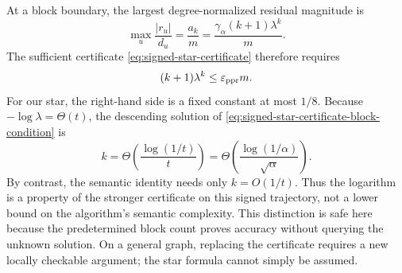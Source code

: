 At a block boundary, the largest degree-normalized residual magnitude is
\begin{equation}
  \max_u\frac{|r_u|}{d_u}
  =\frac{a_k}{m}
  =\frac{\gamma_\alpha(k+1)\lambda^k}{m}.
  \label{eq:signed-star-residual-at-block}
\end{equation}
The sufficient certificate \eqref{eq:signed-star-certificate} therefore
requires
\begin{equation}
  (k+1)\lambda^k\le\varepsilon_{\rm ppr}m.
  \label{eq:signed-star-certificate-block-condition}
\end{equation}
For our star, the right-hand side is a fixed constant at most $1/8$.
Because $-\log\lambda=\Theta(t)$, the descending solution of
\eqref{eq:signed-star-certificate-block-condition} is
\begin{equation}
  k=\Theta\!\left(\frac{\log(1/t)}{t}\right)
   =\Theta\!\left(
      \frac{\log(1/\alpha)}{\sqrt\alpha}
     \right).
  \label{eq:signed-star-certificate-log}
\end{equation}
By contrast, the semantic identity needs only $k=O(1/t)$.  Thus the
logarithm is a property of the stronger certificate on this signed trajectory,
not a lower bound on the algorithm's semantic complexity.  This distinction
is safe here because the predetermined block count proves accuracy without
querying the unknown solution.  On a general graph, replacing the certificate
requires a new locally checkable argument; the star formula cannot simply be
assumed.
